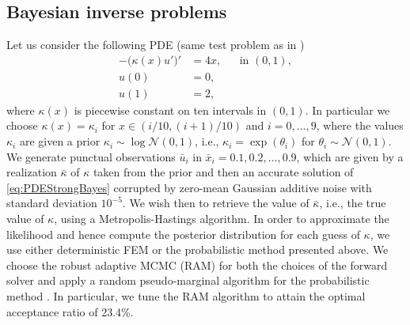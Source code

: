 \documentclass[10pt]{article}
\begin{document}
\subsection{Bayesian inverse problems} Let us consider the following PDE (same test problem as in \cite{CGS16})
\begin{equation}\label{eq:PDEStrongBayes}
\begin{aligned}
-\big(\kappa(x)u'\big)' &= 4x, && \text{in } (0, 1),\\
	u(0) &= 0,\\
	u(1) &= 2,
\end{aligned}
\end{equation}	
where $\kappa(x)$ is piecewise constant on ten intervals in $(0, 1)$. In particular we choose $\kappa(x) = \kappa_i$ for $x \in (i/10, (i+1)/10)$ and $i = 0, \ldots, 9$, where the values $\kappa_i$ are given a prior $\kappa_i \sim \log \mathcal{N}(0, 1)$, i.e., $\kappa_i = \exp(\theta_i)$ for $\theta_i \sim \mathcal{N}(0, 1)$. We generate punctual observations $\bar u_i$ in $\bar x_i = 0.1, 0.2, \ldots, 0.9$, which are given by a realization $\bar \kappa$ of $\kappa$ taken from the prior and then an accurate solution of \eqref{eq:PDEStrongBayes} corrupted by zero-mean Gaussian additive noise with standard deviation $10^{-5}$. We wish then to retrieve the value of $\bar \kappa$, i.e., the true value of $\kappa$, using a Metropolis-Hastings algorithm. In order to approximate the likelihood and hence compute the posterior distribution for each guess of $\kappa$, we use either deterministic FEM or the probabilistic method presented above. We choose the robust adaptive MCMC (RAM) \cite{Vih12} for both the choices of the forward solver and apply a random pseudo-marginal algorithm for the probabilistic method \cite{MLR16}. In particular, we tune the RAM algorithm to attain the optimal acceptance ratio of 23.4\%.



\end{document}
